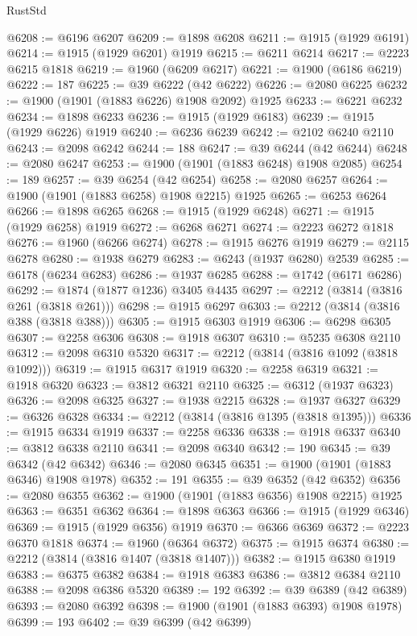 \begin{lexlean}{RustStd}
\begin{coremodule}
@6208 := @6196 @6207
@6209 := @1898 @6208
@6211 := @1915 (@1929 @6191)
@6214 := @1915 (@1929 @6201) @1919
@6215 := @6211 @6214
@6217 := @2223 @6215 @1818
@6219 := @1960 (@6209 @6217)
@6221 := @1900 (@6186 @6219)
@6222 := 187
@6225 := @39 @6222 (@42 @6222)
@6226 := @2080 @6225
@6232 := @1900 (@1901 (@1883 @6226) @1908 @2092) @1925
@6233 := @6221 @6232
@6234 := @1898 @6233
@6236 := @1915 (@1929 @6183)
@6239 := @1915 (@1929 @6226) @1919
@6240 := @6236 @6239
@6242 := @2102 @6240 @2110
@6243 := @2098 @6242
@6244 := 188
@6247 := @39 @6244 (@42 @6244)
@6248 := @2080 @6247
@6253 := @1900 (@1901 (@1883 @6248) @1908 @2085)
@6254 := 189
@6257 := @39 @6254 (@42 @6254)
@6258 := @2080 @6257
@6264 := @1900 (@1901 (@1883 @6258) @1908 @2215) @1925
@6265 := @6253 @6264
@6266 := @1898 @6265
@6268 := @1915 (@1929 @6248)
@6271 := @1915 (@1929 @6258) @1919
@6272 := @6268 @6271
@6274 := @2223 @6272 @1818
@6276 := @1960 (@6266 @6274)
@6278 := @1915 @6276 @1919
@6279 := @2115 @6278
@6280 := @1938 @6279
@6283 := @6243 (@1937 @6280) @2539
@6285 := @6178 (@6234 @6283)
@6286 := @1937 @6285
@6288 := @1742 (@6171 @6286)
@6292 := @1874 (@1877 @1236) @3405 @4435
@6297 := @2212 (@3814 (@3816 @261 (@3818 @261)))
@6298 := @1915 @6297
@6303 := @2212 (@3814 (@3816 @388 (@3818 @388)))
@6305 := @1915 @6303 @1919
@6306 := @6298 @6305
@6307 := @2258 @6306
@6308 := @1918 @6307
@6310 := @5235 @6308 @2110
@6312 := @2098 @6310 @5320
@6317 := @2212 (@3814 (@3816 @1092 (@3818 @1092)))
@6319 := @1915 @6317 @1919
@6320 := @2258 @6319
@6321 := @1918 @6320
@6323 := @3812 @6321 @2110
@6325 := @6312 (@1937 @6323)
@6326 := @2098 @6325
@6327 := @1938 @2215
@6328 := @1937 @6327
@6329 := @6326 @6328
@6334 := @2212 (@3814 (@3816 @1395 (@3818 @1395)))
@6336 := @1915 @6334 @1919
@6337 := @2258 @6336
@6338 := @1918 @6337
@6340 := @3812 @6338 @2110
@6341 := @2098 @6340
@6342 := 190
@6345 := @39 @6342 (@42 @6342)
@6346 := @2080 @6345
@6351 := @1900 (@1901 (@1883 @6346) @1908 @1978)
@6352 := 191
@6355 := @39 @6352 (@42 @6352)
@6356 := @2080 @6355
@6362 := @1900 (@1901 (@1883 @6356) @1908 @2215) @1925
@6363 := @6351 @6362
@6364 := @1898 @6363
@6366 := @1915 (@1929 @6346)
@6369 := @1915 (@1929 @6356) @1919
@6370 := @6366 @6369
@6372 := @2223 @6370 @1818
@6374 := @1960 (@6364 @6372)
@6375 := @1915 @6374
@6380 := @2212 (@3814 (@3816 @1407 (@3818 @1407)))
@6382 := @1915 @6380 @1919
@6383 := @6375 @6382
@6384 := @1918 @6383
@6386 := @3812 @6384 @2110
@6388 := @2098 @6386 @5320
@6389 := 192
@6392 := @39 @6389 (@42 @6389)
@6393 := @2080 @6392
@6398 := @1900 (@1901 (@1883 @6393) @1908 @1978)
@6399 := 193
@6402 := @39 @6399 (@42 @6399)

\end{coremodule}
\end{lexlean}
